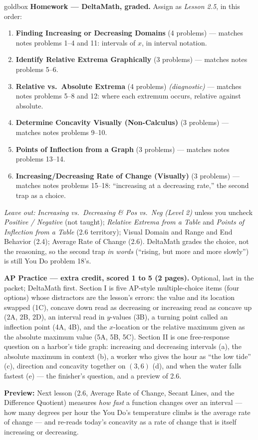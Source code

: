 \documentclass[10pt]{article}
\begin{document}
\begin{skillbox}{goldbox}
\textbf{Homework --- DeltaMath, graded.} Assign as \textit{Lesson 2.5}, in this order:
\begin{enumerate}[itemsep=1pt,topsep=2pt]
  \item \textbf{Finding Increasing or Decreasing Domains} (4 problems) --- matches notes
        problems 1--4 and 11: intervals of $x$, in interval notation.
  \item \textbf{Identify Relative Extrema Graphically} (3 problems) --- matches notes problems
        5--6.
  \item \textbf{Relative vs.\ Absolute Extrema} (4 problems) \textit{(diagnostic)} --- matches
        notes problems 5--8 and 12: where each extremum occurs, relative against absolute.
  \item \textbf{Determine Concavity Visually (Non-Calculus)} (3 problems) --- matches notes
        problems 9--10.
  \item \textbf{Points of Inflection from a Graph} (3 problems) --- matches notes problems
        13--14.
  \item \textbf{Increasing/Decreasing Rate of Change (Visually)} (3 problems) --- matches notes
        problems 15--18: ``increasing at a decreasing rate,'' the second trap as a choice.
\end{enumerate}
\textit{Leave out:} \textit{Increasing vs.\ Decreasing \& Pos vs.\ Neg (Level 2)} unless you
uncheck \textit{Positive / Negative} (not taught); \textit{Relative Extrema from a Table} and
\textit{Points of Inflection from a Table} (2.6 territory); Visual Domain and Range and End
Behavior (2.4); Average Rate of Change (2.6). DeltaMath grades the choice, not the reasoning, so
the second trap \emph{in words} (``rising, but more and more slowly'') is still You Do problem
18's.

\textbf{AP Practice --- extra credit, scored 1 to 5 (2 pages).} Optional, last in the packet; DeltaMath first.
Section I is five AP-style multiple-choice items (four options) whose distractors are the
lesson's errors: the value and its location swapped (1C), concave down read as decreasing or
increasing read as concave up (2A, 2B, 2D), an interval read in $y$-values (3B), a turning point
called an inflection point (4A, 4B), and the $x$-location or the relative maximum given as the
absolute maximum value (5A, 5B, 5C). Section II is one free-response question on a harbor's tide
graph: increasing and decreasing intervals (a), the absolute maximum in context (b), a worker who
gives the hour as ``the low tide'' (c), direction and concavity together on $(3, 6)$ (d), and when
the water falls fastest (e) --- the finisher's question, and a preview of 2.6.

\textbf{Preview:} Next lesson (2.6, Average Rate of Change, Secant Lines, and the Difference
Quotient) measures \emph{how fast} a function changes over an interval --- how many degrees per
hour the You Do's temperature climbs is the average rate of change --- and re-reads today's
concavity as a rate of change that is itself increasing or decreasing.
\end{skillbox}
\end{document}

